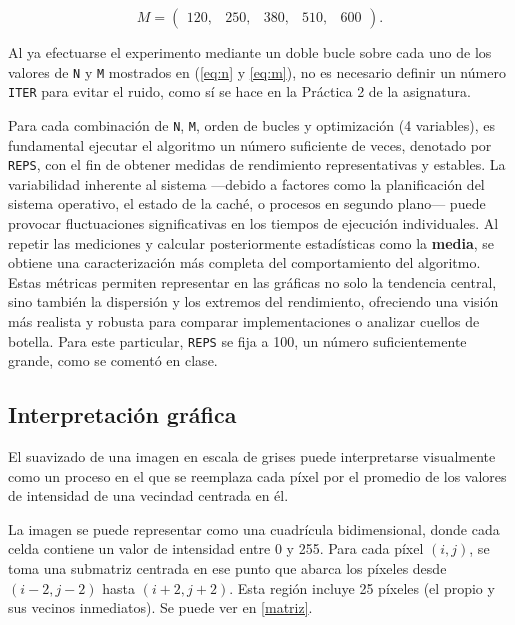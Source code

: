 \documentclass[11pt,a4paper,twoside]{article}
\theoremstyle{definition}
\begin{document}
	\begin{equation} \label{eq:m}
		M = \left( \begin{matrix}
			120, & 250, & 380, & 510, & 600
		\end{matrix} \right).
	\end{equation}
	
	Al ya efectuarse el experimento mediante un doble bucle sobre cada uno de los valores de \texttt{N} y \texttt{M} mostrados en (\ref{eq:n} y \ref{eq:m}), no es necesario definir un número \texttt{ITER} para evitar el ruido, como sí se hace en la Práctica 2 de la asignatura.

	Para cada combinación de \texttt{N}, \texttt{M}, orden de bucles y optimización (4 variables), es fundamental ejecutar el algoritmo un número suficiente de veces, denotado por \texttt{REPS}, con el fin de obtener medidas de rendimiento representativas y estables. La variabilidad inherente al sistema ---debido a factores como la planificación del sistema operativo, el estado de la caché, o procesos en segundo plano--- puede provocar fluctuaciones significativas en los tiempos de ejecución individuales. Al repetir las mediciones y calcular posteriormente estadísticas como la \textbf{media}, se obtiene una caracterización más completa del comportamiento del algoritmo. Estas métricas permiten representar en las gráficas no solo la tendencia central, sino también la dispersión y los extremos del rendimiento, ofreciendo una visión más realista y robusta para comparar implementaciones o analizar cuellos de botella. Para este particular, \texttt{REPS} se fija a 100, un número suficientemente grande, como se comentó en clase.
	
	
	\subsection{Interpretación gráfica}
		
	El suavizado de una imagen en escala de grises puede interpretarse visualmente como un proceso en el que se reemplaza cada píxel por el promedio de los valores de intensidad de una vecindad centrada en él. 
	
	La imagen se puede representar como una cuadrícula bidimensional, donde cada celda contiene un valor de intensidad entre 0 y 255. Para cada píxel $(i,j)$, se toma una submatriz centrada en ese punto que abarca los píxeles desde $(i-2, j-2)$ hasta $(i+2, j+2)$. Esta región incluye 25 píxeles (el propio y sus vecinos inmediatos). Se puede ver en \ref{matriz}.
	
\end{document}
